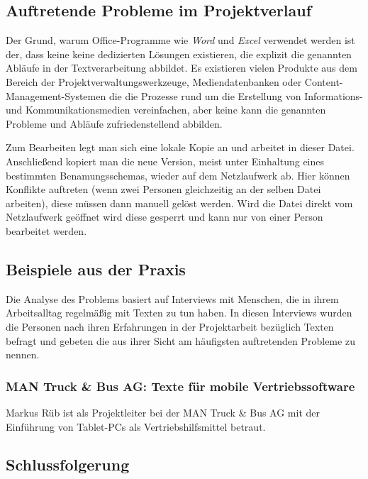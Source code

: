 \subsection{Auftretende Probleme im Projektverlauf}
\label{l:officeprobleme}


Der Grund, warum Office-Programme wie \emph{Word} und \emph{Excel} verwendet werden ist der, dass keine keine dedizierten Lösungen existieren, die explizit die genannten Abläufe in der Textverarbeitung abbildet. Es existieren vielen Produkte aus dem Bereich der Projektverwaltungswerkzeuge, Mediendatenbanken oder Content-Management-Systemen die die Prozesse rund um die Erstellung von Informations- und Kommunikationsmedien vereinfachen, aber keine kann die genannten Probleme und Abläufe zufriedenstellend abbilden.

Zum Bearbeiten legt man sich eine lokale Kopie an und arbeitet in dieser Datei. Anschließend kopiert man die neue Version, meist unter Einhaltung eines bestimmten Benamungsschemas, wieder auf dem Netzlaufwerk ab. Hier können Konflikte auftreten (wenn zwei Personen gleichzeitig an der selben Datei arbeiten), diese müssen dann manuell gelöst werden. Wird die Datei direkt vom Netzlaufwerk geöffnet wird diese gesperrt und kann nur von einer Person bearbeitet werden.


\subsection{Beispiele aus der Praxis}

Die Analyse des Problems basiert auf Interviews mit Menschen, die in ihrem Arbeitsalltag regelmäßig mit Texten zu tun haben. In diesen Interviews wurden die Personen nach ihren Erfahrungen in der Projektarbeit bezüglich Texten befragt und gebeten die aus ihrer Sicht am häufigsten auftretenden Probleme zu nennen.

\subsubsection{MAN Truck \& Bus AG: Texte für mobile Vertriebssoftware}

Markus Rüb ist als Projektleiter bei der MAN Truck \& Bus AG mit der Einführung von Tablet-PCs als Vertriebshilfsmittel betraut.

\subsection{Schlussfolgerung}

